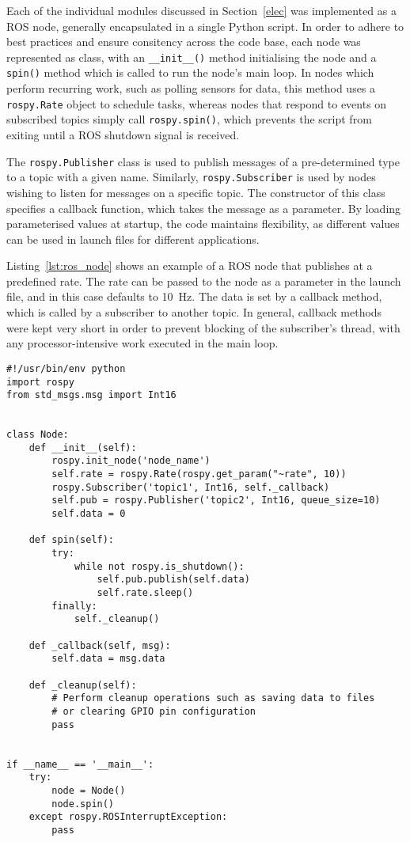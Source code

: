 Each of the individual modules discussed in Section~\ref{elec} was implemented as a ROS node, generally encapsulated in a single Python script. In order to adhere to best practices and ensure consitency across the code base, each node was represented as class, with an \verb|__init__()| method initialising the node and a \verb|spin()| method which is called to run the node's main loop. In nodes which perform recurring work, such as polling sensors for data, this method uses a \verb|rospy.Rate| object to schedule tasks, whereas nodes that respond to events on subscribed topics simply call \verb|rospy.spin()|, which prevents the script from exiting until a ROS shutdown signal is received.

The \verb|rospy.Publisher| class is used to publish messages of a pre-determined type to a topic with a given name. Similarly, \verb|rospy.Subscriber| is used by nodes wishing to listen for messages on a specific topic. The constructor of this class specifies a callback function, which takes the message as a parameter. By loading parameterised values at startup, the code maintains flexibility, as different values can be used in launch files for different applications.

Listing~\ref{lst:ros_node} shows an example of a ROS node that publishes at a predefined rate. The rate can be passed to the node as a parameter in the launch file, and in this case defaults to \SI{10}{\Hz}. The data is set by a callback method, which is called by a subscriber to another topic. In general, callback methods were kept very short in order to prevent blocking of the subscriber's thread, with any processor-intensive work executed in the main loop.

\begin{lstlisting}[caption={Example ROS node}, label={lst:ros_node}]
#!/usr/bin/env python
import rospy
from std_msgs.msg import Int16


class Node:
    def __init__(self):
        rospy.init_node('node_name')
        self.rate = rospy.Rate(rospy.get_param("~rate", 10))
        rospy.Subscriber('topic1', Int16, self._callback)
        self.pub = rospy.Publisher('topic2', Int16, queue_size=10)
        self.data = 0

    def spin(self):
        try:
            while not rospy.is_shutdown():
                self.pub.publish(self.data)
                self.rate.sleep()
        finally:
            self._cleanup()

    def _callback(self, msg):
        self.data = msg.data

    def _cleanup(self):
        # Perform cleanup operations such as saving data to files
        # or clearing GPIO pin configuration
        pass


if __name__ == '__main__':
    try:
        node = Node()
        node.spin()
    except rospy.ROSInterruptException:
        pass
\end{lstlisting}


